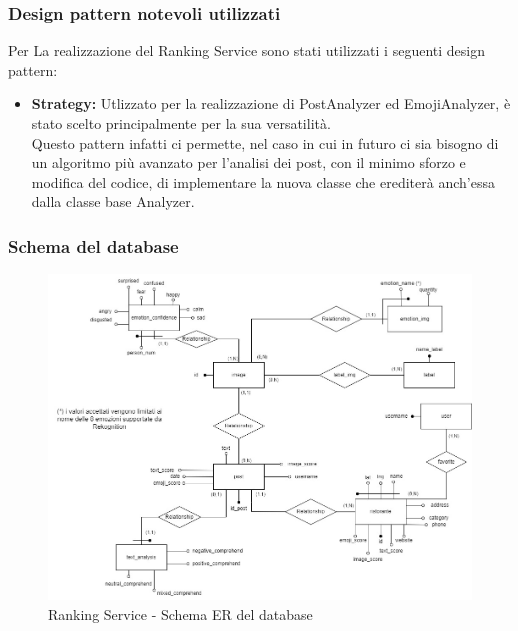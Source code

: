 \subsubsection{Design pattern notevoli utilizzati}
Per La realizzazione del Ranking Service sono stati utilizzati i seguenti design pattern:
\begin{itemize}
    \item \textbf{Strategy:} Utlizzato per la realizzazione di PostAnalyzer ed EmojiAnalyzer, è stato scelto principalmente per la sua versatilità.\\
    Questo pattern infatti ci permette, nel caso in cui in futuro ci sia bisogno di un algoritmo più avanzato per l'analisi dei post, con il minimo sforzo e modifica del codice, di implementare la nuova classe che erediterà anch'essa dalla classe base Analyzer.
\end{itemize}

\subsubsection{Schema del database}
\begin{figure}[h]
    \centering
    \includegraphics[scale=0.35]{Contenuto/Immagini/ER-RS.jpg}
    \caption{Ranking Service - Schema ER del database}
\end{figure}